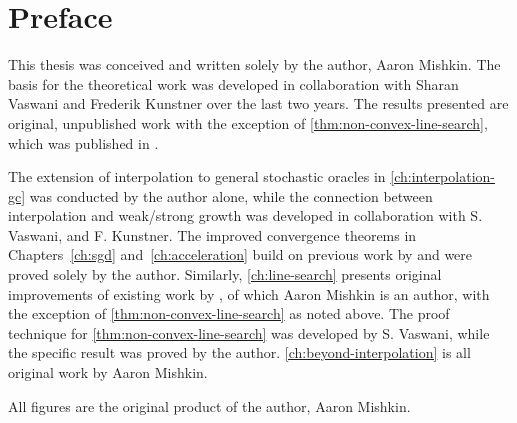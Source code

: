 
\chapter{Preface}

This thesis was conceived and written solely by the author, Aaron Mishkin. 
The basis for the theoretical work was developed in collaboration with Sharan Vaswani and Frederik Kunstner over the last two years.
The results presented are original, unpublished work with the exception of \autoref{thm:non-convex-line-search}, which was published in \citet{vaswani2019painless}.

The extension of interpolation to general stochastic oracles in \autoref{ch:interpolation-gc} was conducted by the author alone, while the connection between interpolation and weak/strong growth was developed in collaboration with S. Vaswani, and F. Kunstner. 
The improved convergence theorems in Chapters~\ref{ch:sgd} and~\ref{ch:acceleration} build on previous work by \citet{vaswani2019fast} and were proved solely by the author.  
Similarly, \autoref{ch:line-search} presents original improvements of existing work by \citet{vaswani2019painless}, of which Aaron Mishkin is an author, with the exception of \autoref{thm:non-convex-line-search} as noted above.
The proof technique for \autoref{thm:non-convex-line-search} was developed by S. Vaswani, while the specific result was proved by the author. 
\autoref{ch:beyond-interpolation} is all original work by Aaron Mishkin. 

All figures are the original product of the author, Aaron Mishkin.


